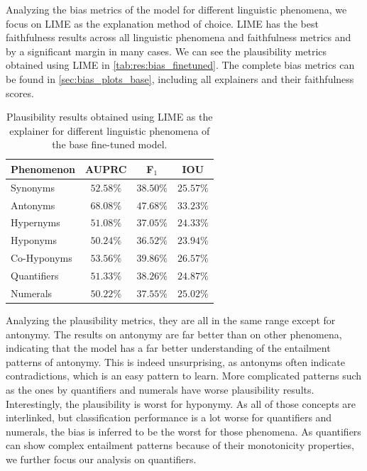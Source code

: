 Analyzing the bias metrics of the model for different linguistic phenomena, we focus on \ac{LIME} as the explanation method of choice. \ac{LIME} has the best faithfulness results across all linguistic phenomena and faithfulness metrics and by a significant margin in many cases. We can see the plausibility metrics obtained using \ac{LIME} in \autoref{tab:res:bias_finetuned}. The complete bias metrics can be found in \autoref{sec:bias_plots_base}, including all explainers and their faithfulness scores.

\begin{table}[ht!]
    \centering
    \caption{Plausibility results obtained using \ac{LIME} as the explainer for different linguistic phenomena of the base fine-tuned model.}
    \begin{tabular}{l c c c}
        \toprule
        \multicolumn{1}{c}{Phenomenon} & \acs{AUPRC} & F$_1$ & \acs{IOU}\\
        \midrule
        Synonyms & $52.58\%$ & $38.50\%$ & $25.57\%$ \\
        Antonyms & $68.08\%$ & $47.68\%$ & $33.23\%$ \\
        Hypernyms & $51.08\%$ & $37.05\%$ & $24.33\%$ \\
        Hyponyms & $50.24\%$ & $36.52\%$ & $23.94\%$ \\
        Co-Hyponyms & $53.56\%$ & $39.86\%$ & $26.57\%$ \\
        Quantifiers & $51.33\%$ & $38.26\%$ & $24.87\%$ \\
        Numerals & $50.22\%$ & $37.55\%$ & $25.02\%$ \\
        \bottomrule
    \end{tabular}
    \label{tab:res:bias_finetuned}
\end{table}

Analyzing the plausibility metrics, they are all in the same range except for antonymy. The results on antonymy are far better than on other phenomena, indicating that the model has a far better understanding of the entailment patterns of antonymy. This is indeed unsurprising, as antonyms often indicate contradictions, which is an easy pattern to learn. More complicated patterns such as the ones by quantifiers and numerals have worse plausibility results. Interestingly, the plausibility is worst for hyponymy. As all of those concepts are interlinked, but classification performance is a lot worse for quantifiers and numerals, the bias is inferred to be the worst for those phenomena. As quantifiers can show complex entailment patterns because of their monotonicity properties, we further focus our analysis on quantifiers.

